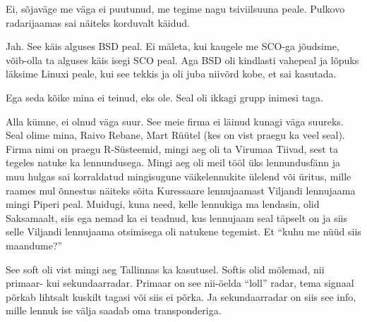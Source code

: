 
Ei, sõjaväge me väga ei puutunud, me tegime nagu tsiviilsuuna peale. Pulkovo 
radarijaamas sai näiteks korduvalt käidud.


Jah. See käis alguses BSD peal. Ei mäleta, kui kaugele me SCO-ga jõudsime, 
võib-olla ta alguses käis isegi SCO peal. Aga BSD oli kindlasti vahepeal ja  
lõpuks läksime Linuxi peale, kui see tekkis ja oli juba niivõrd 
kobe, et sai kasutada.
                 

Ega seda  kõike mina ei teinud, eks ole. Seal oli ikkagi grupp inimesi taga.


Alla kümne,  ei olnud väga suur. See meie firma ei läinud kunagi väga suureks. 
Seal olime mina,  Raivo Rebane, Mart 
Rüütel (kes on vist praegu ka veel seal). Firma nimi  
on praegu R-Süsteemid, mingi aeg oli ta Virumaa 
Tiivad, sest ta tegeles natuke ka 
lennundusega. Mingi aeg oli meil tööl üks lennundusfänn ja  muu hulgas sai 
korraldatud mingisugune väikelennukite ülelend või üritus,  mille raames mul 
õnnestus näiteks sõita Kuressaare lennujaamast Viljandi lennujaama mingi Piperi 
peal. Muidugi, kuna need, kelle lennukiga ma lendasin, olid Saksamaalt, siis 
ega nemad ka ei teadnud, kus lennujaam seal täpselt on ja siis selle Viljandi 
lennujaama otsimisega oli natukene tegemist. Et \enquote{kuhu me nüüd siis 
maandume?}
                 

See soft oli vist mingi aeg Tallinnas ka kasutusel. Softis olid mõlemad, nii 
primaar- kui sekundaarradar. Primaar on see nii-öelda \enquote{loll} radar, 
tema signaal põrkab lihtsalt kuskilt tagasi või siis ei põrka. Ja 
sekundaarradar on siis see info, mille lennuk  ise välja saadab oma  
transponderiga.
                 

